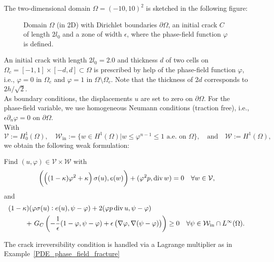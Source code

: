 The two-dimensional domain $\Omega = (-10,10)^2$ is sketched in the following figure: 
\begin{figure}[htbp!]
 \centering
{}
\caption{Domain $\Omega$ (in 2D) with Dirichlet boundaries $\partial\Omega$, an initial crack $C$ of length $2l_0$ and a zone of width $\epsilon$, where the phase-field function $\varphi$ is defined.}
 \end{figure}
 
 An initial crack with length $2l_0 = 2.0$
and thickness $d$ of two cells
on 
$\Omega_c=[-1,1] \times [-d, d] \subset \Omega$ 
is prescribed by help of the phase-field function $\varphi$, i.e.,
$\varphi = 0$ in $\Omega_c$ and $\varphi = 1$ in $\Omega\setminus\Omega_c$.
Note that the thickness of $2d$ corresponds to $2h/\sqrt{2}$.\\
As boundary conditions, the displacements $u$ are set to zero on $\partial
\Omega$.
For the phase-field variable, we use homogeneous Neumann conditions (traction
free), i.e., $\epsilon \partial_n \varphi = 0$ on $\partial \Omega$.\\

With
\[
  \mathcal{V}:=H_0^1(\Omega), \quad  \mathcal{W}_{\text{in}}:=\{w \in H^1(\Omega)| w\leq
  \varphi^{n-1} \leq 1\text{ a.e. on }\Omega\}, \quad\text{and}\quad\mathcal{ W}:=H^1(\Omega),
\]
we obtain the following weak formulation:

\begin{Problem}
Find $(u,\varphi) \in \mathcal{V} \times \mathcal{W}$ with
\begin{align*}
\left( \left((1-\kappa)\varphi^2 + \kappa\right) \sigma(u),e(w)\right)+(\varphi^2 p,\operatorname{div} w)=0\quad \forall w \in \mathcal{V},
\end{align*}
and
\begin{align*}
(1- \kappa)(&\varphi \sigma(u):e(u),\psi-\varphi) + 2(\varphi p \Div u,\psi-\varphi)\\
+&\ G_C\left(-\frac{1}{\epsilon}(1-\varphi,\psi-\varphi)+\epsilon\left(\nabla \varphi,\nabla(\psi-\varphi)\right) \right)\geq 0\quad \forall \psi \in \mathcal{W}_{\text{in}} \cap L^{\infty}(\Omega).
\end{align*}
\end{Problem}
The crack irreversibility condition is handled via a Lagrange multiplier as in Example~\ref{PDE_phase_field_fracture}\\

